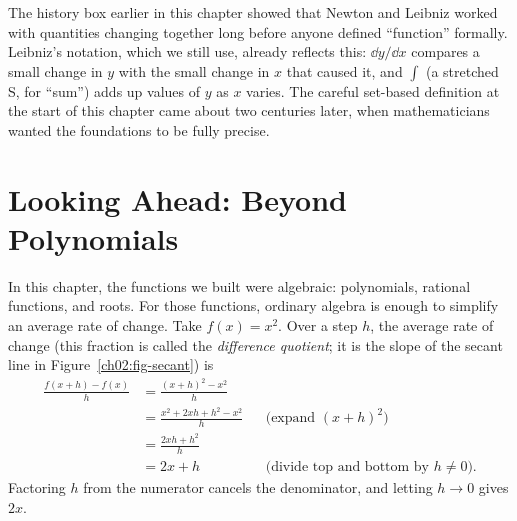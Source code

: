 \begin{connectionbox}
The history box earlier in this chapter showed that Newton and Leibniz worked with
quantities changing together long before anyone defined ``function'' formally.
Leibniz's notation, which we still use, already reflects this: $\dd y/\dd x$
compares a small change in $y$ with the small change in $x$ that caused it, and
$\int$ (a stretched S, for ``sum'') adds up values of $y$ as $x$ varies. The
careful set-based definition at the start of this chapter came about two
centuries later, when mathematicians wanted the foundations to be fully precise.
\end{connectionbox}

\section{Looking Ahead: Beyond Polynomials}
\label{ch02:looking-ahead}

In this chapter, the functions we built were algebraic: polynomials, rational functions,
and roots. For those functions, ordinary algebra is enough to simplify an average rate of change.
Take $f(x) = x^2$. Over a step $h$, the average rate of change (this fraction is
called the \emph{difference quotient}; it is the slope of the secant line in
Figure~\ref{ch02:fig-secant}) is
\begin{align*}
  \frac{f(x+h) - f(x)}{h}
    &= \frac{(x+h)^2 - x^2}{h} \\
    &= \frac{x^2 + 2xh + h^2 - x^2}{h} && \text{(expand $(x+h)^2$)} \\
    &= \frac{2xh + h^2}{h} \\
    &= 2x + h && \text{(divide top and bottom by $h \ne 0$).}
\end{align*}
Factoring $h$ from the numerator cancels the denominator, and letting $h \to 0$ gives $2x$.

